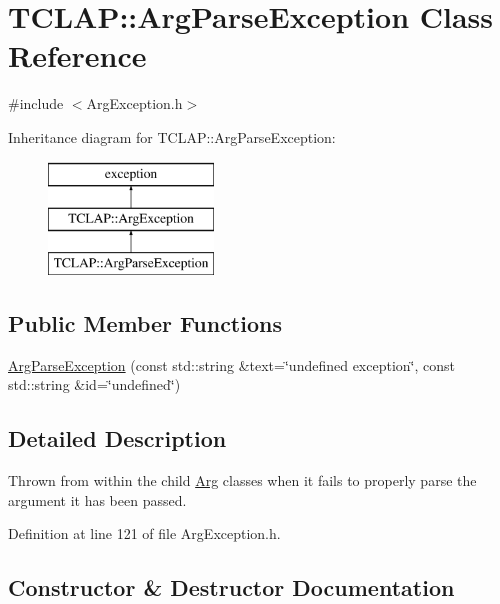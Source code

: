 \hypertarget{class_t_c_l_a_p_1_1_arg_parse_exception}{}\section{T\+C\+L\+A\+P\+:\+:Arg\+Parse\+Exception Class Reference}
\label{class_t_c_l_a_p_1_1_arg_parse_exception}


{\ttfamily \#include $<$Arg\+Exception.\+h$>$}

Inheritance diagram for T\+C\+L\+A\+P\+:\+:Arg\+Parse\+Exception\+:\begin{figure}[H]
\begin{center}
\leavevmode
\includegraphics[height=3.000000cm]{class_t_c_l_a_p_1_1_arg_parse_exception}
\end{center}
\end{figure}
\subsection*{Public Member Functions}
\begin{DoxyCompactItemize}
\item 
\hyperlink{class_t_c_l_a_p_1_1_arg_parse_exception_aa9d9531405e505afd506491526733285}{Arg\+Parse\+Exception} (const std\+::string \&text=\char`\"{}undefined exception\char`\"{}, const std\+::string \&id=\char`\"{}undefined\char`\"{})
\end{DoxyCompactItemize}


\subsection{Detailed Description}
Thrown from within the child \hyperlink{class_t_c_l_a_p_1_1_arg}{Arg} classes when it fails to properly parse the argument it has been passed. 

Definition at line 121 of file Arg\+Exception.\+h.



\subsection{Constructor \& Destructor Documentation}
\hypertarget{class_t_c_l_a_p_1_1_arg_parse_exception_aa9d9531405e505afd506491526733285}{}
